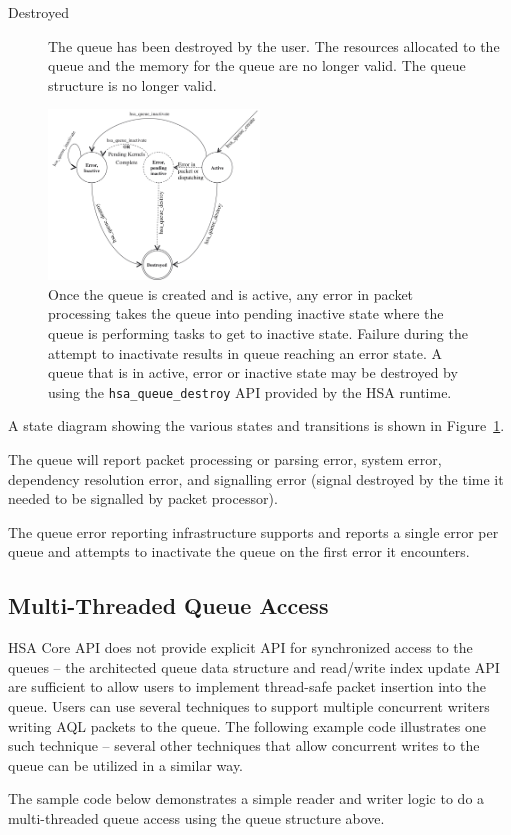 \begin{description}
\item[Destroyed] The queue has been destroyed by the user.  The
resources allocated to the queue and the memory for the queue are no
longer valid. The queue structure is no longer valid.
\end{description}

\begin{figure}
  \centering
  \includegraphics[width=0.5\textwidth] {fig/queuestate}
  \centering
  \caption{Once the queue is created and is active, any error in
          packet processing takes the queue into pending inactive
          state where the queue is performing tasks to get to
          inactive state. Failure during the attempt to inactivate
          results in queue reaching an error state. A queue that is
          in active, error or inactive state may be destroyed by
          using the \texttt{hsa\_queue\_destroy} API provided by
  the HSA runtime.}
  \label{fig:queuestate}
\end{figure}

A state diagram showing the various states and transitions is shown
in Figure~\ref{fig:queuestate}.

The queue will report packet processing or parsing error, system
error, dependency resolution error, and signalling error (signal
destroyed by the time it needed to be signalled by packet processor).

The queue error reporting infrastructure supports and reports a
single error per queue and attempts to inactivate the queue on the
first error it encounters.

\hypertarget{coreapi_multithreading}{}\subsection{Multi-\/\-Threaded
Queue Access}\label{coreapi_multithreading}
H\-S\-A Core API does not provide explicit API for synchronized
access to the queues -- the architected queue data structure and
read/write index update API are
sufficient to allow users to implement thread-safe packet insertion
into the queue. Users can use several techniques to support
multiple concurrent writers writing AQL packets to the queue.  The
following example code illustrates one such technique -- several
other techniques that allow concurrent writes to the queue can be
utilized in a similar way.

The sample code below demonstrates a simple reader and writer logic
to do a multi-threaded queue access using the queue structure above.

\begin{framed}

\end{framed}

